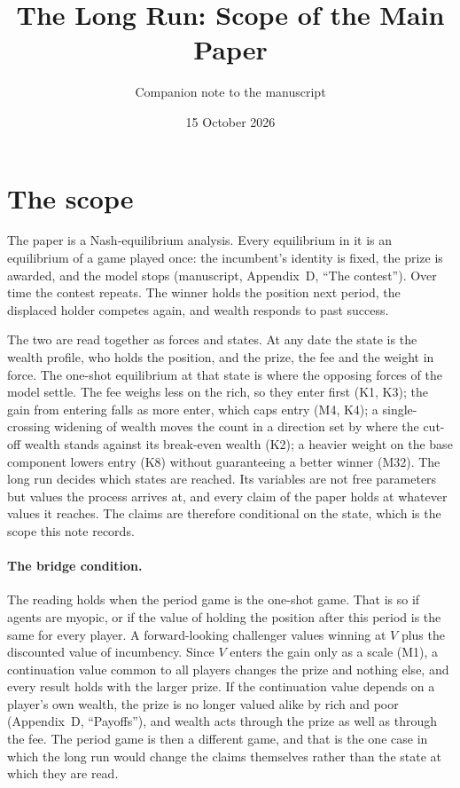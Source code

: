 \documentclass[11pt]{article}
\title{The Long Run: Scope of the Main Paper}
\author{Companion note to the manuscript}
\date{15 October 2026}
\begin{document}
\maketitle

\section{The scope}

The paper is a Nash-equilibrium analysis. Every equilibrium in it is an
equilibrium of a game played once: the incumbent's identity is fixed, the prize
is awarded, and the model stops (manuscript, Appendix~D, ``The contest''). Over
time the contest repeats. The winner holds the position next period, the
displaced holder competes again, and wealth responds to past success.

The two are read together as forces and states. At any date the state is the
wealth profile, who holds the position, and the prize, the fee and the weight in
force. The one-shot equilibrium at that state is where the opposing forces of
the model settle. The fee weighs less on the rich, so they enter first (K1,
K3); the gain from entering falls as more enter, which caps entry (M4, K4); a
single-crossing widening of wealth moves the count in a direction set by where
the cut-off wealth stands against its break-even wealth (K2); a heavier weight on the base component lowers entry (K8)
without guaranteeing a better winner (M32). The long run decides which states
are reached. Its variables are not free parameters but values the process
arrives at, and every claim of the paper holds at whatever values it reaches.
The claims are therefore conditional on the state, which is the scope this note
records.

\paragraph{The bridge condition.} The reading holds when the period game is the
one-shot game. That is so if agents are myopic, or if the value of holding the
position after this period is the same for every player. A forward-looking
challenger values winning at $V$ plus the discounted value of incumbency. Since
$V$ enters the gain only as a scale (M1), a continuation value common to all
players changes the prize and nothing else, and every result holds with the
larger prize. If the continuation value depends on a player's own wealth, the
prize is no longer valued alike by rich and poor (Appendix~D, ``Payoffs''), and
wealth acts through the prize as well as through the fee. The period game is
then a different game, and that is the one case in which the long run would
change the claims themselves rather than the state at which they are read.
\end{document}
